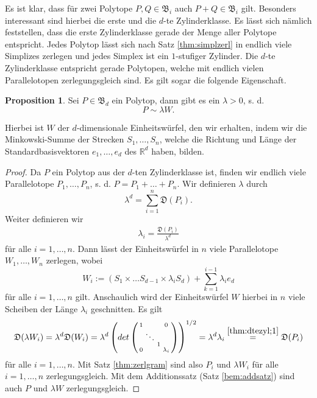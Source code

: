 \documentclass[11pt,titlepage]{article}
\newcommand{\setR}{\mathbb{R}}
\theoremstyle{definition}
\newtheorem{proposition}[theorem]{Proposition}
\theoremstyle{remark}
\begin{document}
	Es ist klar, dass für zwei Polytope $P,Q\in \mathfrak{B}_i$ 
	auch $P+Q\in\mathfrak{B}_i$ gilt. 
	Besonders interessant sind hierbei die erste und die $d$-te Zylinderklasse. 
	Es lässt sich nämlich feststellen, dass die erste Zylinderklasse gerade 
	der Menge aller Polytope entspricht. Jedes Polytop lässt sich nach Satz  
	\ref{thm:simplzerl} in endlich viele Simplizes zerlegen und jedes Simplex ist ein $1$-stufiger Zylinder. 
	Die $d$-te Zylinderklasse entspricht gerade Polytopen, welche mit endlich vielen 
	Parallelotopen zerlegungsgleich sind. Es gilt sogar die folgende Eigenschaft.
	
	\begin{proposition} \label{bem:dteZylinderklasse}
		Sei $P\in\mathfrak{B}_d$ ein Polytop, dann gibt es ein $\lambda>0$, s. d. 
		\[P\sim \lambda W.\] 
	\end{proposition}
	
	Hierbei ist $W$ der $d$-dimensionale Einheitswürfel, den wir erhalten, 
	indem wir die Minkowski-Summe der Strecken $S_1,\ldots,S_n$, 
	welche die Richtung und Länge der Standardbasisvektoren $e_1,\ldots, e_d$ 
	des $\setR^d$ haben, bilden.
	
	\begin{proof}
		Da $P$ ein Polytop aus der $d$-ten Zylinderklasse ist, finden 
		wir endlich viele Parallelotope $P_1,\ldots, P_n$, s. d. 
		$P=P_1+\ldots+P_n$. Wir definieren $\lambda$ durch 
		\[\lambda^d =\sum_{i=1}^n \mathfrak{D}(P_i).\]
		Weiter definieren wir 
		\begin{align}
			\lambda_i =\frac{\mathfrak{D}(P_i)}{\lambda^d} \label{thm:dtezyl;1}
		\end{align}
		für alle $i=1,\ldots,n$. Dann lässt der Einheitswürfel in $n$ viele 
		Parallelotope $W_1,\ldots,W_n$ zerlegen, wobei
		\[W_i:=(S_1\times\ldots S_{d-1}\times \lambda_i S_d)+
		\sum_{k=1}^{i-1} \lambda_i e_d\]
		für alle $i=1,\ldots,n$ gilt. Anschaulich wird der Einheitswürfel $W$  hierbei in $n$ viele Scheiben der Länge $\lambda_i$ geschnitten. 
		Es gilt 
		\[\mathfrak{D}(\lambda W_i)=\lambda^d \mathfrak{D}(W_i)=
		\lambda^d \left(det \left(\begin{smallmatrix}
		1 & \ &\ &0 \\
		\ &\ddots &\ &\ \\
		\ & \ &  1 &\ \\
		0 & \ & \ & \lambda_i
		\end{smallmatrix}\right)\right)^{1/2}=\lambda^d \lambda_i\overset{\ref{thm:dtezyl;1}}{=}\mathfrak{D}(P_i)\]
		für alle $i=1,\ldots,n$. Mit Satz \ref{thm:zerlgram} 
		sind also $P_i$ und $\lambda W_i$ für alle $i=1,\ldots,n$ zerlegungsgleich. 
		Mit dem Additionssatz (Satz \ref{bem:addsatz}) 
		sind auch $P$ und $\lambda W$ zerlegungsgleich.
	\end{proof}
	
\end{document}
